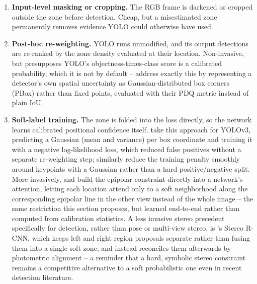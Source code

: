\begin{enumerate}
    \item \textbf{Input-level masking or cropping.} The RGB frame is
    darkened or cropped outside the zone before detection. Cheap, but a
    misestimated zone permanently removes evidence YOLO could otherwise
    have used.
    \item \textbf{Post-hoc re-weighting.} YOLO runs unmodified, and its
    output detections are re-ranked by the zone density evaluated at their
    location. Non-invasive, but presupposes YOLO's objectness-times-class
    score is a calibrated probability, which it is not by default --
    \textcite{hall_probabilistic_2020} address exactly this by representing
    a detector's own spatial uncertainty as Gaussian-distributed box
    corners (PBox) rather than fixed points, evaluated with their PDQ
    metric instead of plain IoU.
    \item \textbf{Soft-label training.} The zone is folded into the loss
    directly, so the network learns calibrated positional confidence
    itself. \textcite{choi_gaussian_2019} take this approach for YOLOv3,
    predicting a Gaussian (mean and variance) per box coordinate and
    training it with a negative log-likelihood loss, which reduced false
    positives without a separate re-weighting step; \textcite{law_cornernet_2020}
    similarly reduce the training penalty smoothly around keypoints with a
    Gaussian rather than a hard positive/negative split. More invasively,
    \textcite{he_epipolar_2020} and \textcite{liu_when_2023} build the
    epipolar constraint directly into a network's attention, letting each
    location attend only to a soft neighborhood along the corresponding
    epipolar line in the other view instead of the whole image -- the
    same restriction this section proposes, but learned end-to-end rather
    than computed from calibration statistics. A less invasive stereo
    precedent specifically for detection, rather than pose or multi-view
    stereo, is \textcite{li_stereo_2019}'s Stereo R-CNN, which keeps left
    and right region proposals separate rather than fusing them into a
    single soft zone, and instead reconciles them afterwards by
    photometric alignment -- a reminder that a hard, symbolic stereo
    constraint remains a competitive alternative to a soft probabilistic
    one even in recent detection literature.
\end{enumerate}


